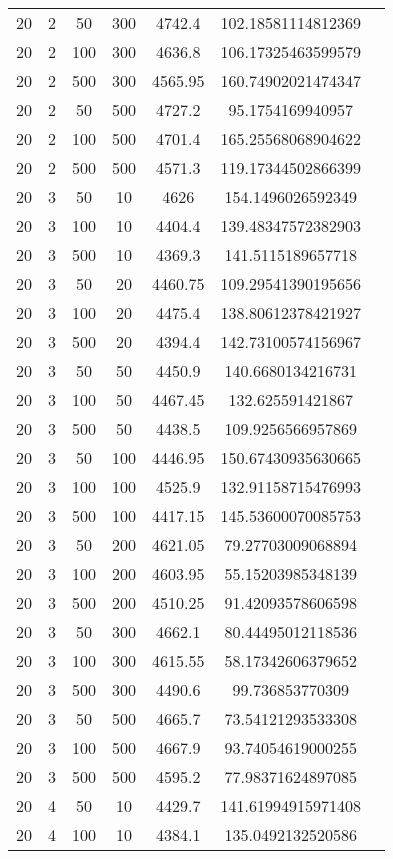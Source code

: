 {\begin{longtabu}{S
S
S
S
S
S[round-mode=places, round-precision=0]
S[round-mode=places, round-precision=0]}
20 & 2 & 50 & 300 & 4742.4 & 102.18581114812369 \\
20 & 2 & 100 & 300 & 4636.8 & 106.17325463599579 \\
20 & 2 & 500 & 300 & 4565.95 & 160.74902021474347 \\
20 & 2 & 50 & 500 & 4727.2 & 95.1754169940957 \\
20 & 2 & 100 & 500 & 4701.4 & 165.25568068904622 \\
20 & 2 & 500 & 500 & 4571.3 & 119.17344502866399 \\
20 & 3 & 50 & 10 & 4626 & 154.1496026592349 \\
20 & 3 & 100 & 10 & 4404.4 & 139.48347572382903 \\
20 & 3 & 500 & 10 & 4369.3 & 141.5115189657718 \\
20 & 3 & 50 & 20 & 4460.75 & 109.29541390195656 \\
20 & 3 & 100 & 20 & 4475.4 & 138.80612378421927 \\
20 & 3 & 500 & 20 & 4394.4 & 142.73100574156967 \\
20 & 3 & 50 & 50 & 4450.9 & 140.6680134216731 \\
20 & 3 & 100 & 50 & 4467.45 & 132.625591421867 \\
20 & 3 & 500 & 50 & 4438.5 & 109.9256566957869 \\
20 & 3 & 50 & 100 & 4446.95 & 150.67430935630665 \\
20 & 3 & 100 & 100 & 4525.9 & 132.91158715476993 \\
20 & 3 & 500 & 100 & 4417.15 & 145.53600070085753 \\
20 & 3 & 50 & 200 & 4621.05 & 79.27703009068894 \\
20 & 3 & 100 & 200 & 4603.95 & 55.15203985348139 \\
20 & 3 & 500 & 200 & 4510.25 & 91.42093578606598 \\
20 & 3 & 50 & 300 & 4662.1 & 80.44495012118536 \\
20 & 3 & 100 & 300 & 4615.55 & 58.17342606379652 \\
20 & 3 & 500 & 300 & 4490.6 & 99.736853770309 \\
20 & 3 & 50 & 500 & 4665.7 & 73.54121293533308 \\
20 & 3 & 100 & 500 & 4667.9 & 93.74054619000255 \\
20 & 3 & 500 & 500 & 4595.2 & 77.98371624897085 \\
20 & 4 & 50 & 10 & 4429.7 & 141.61994915971408 \\
20 & 4 & 100 & 10 & 4384.1 & 135.0492132520586 \\

\end{longtabu}}
